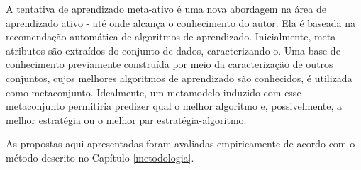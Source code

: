 A tentativa de aprendizado meta-ativo é uma nova abordagem na área de aprendizado ativo - até onde alcança o conhecimento do autor.
Ela é baseada na recomendação automática de algoritmos de aprendizado.
Inicialmente, meta-atributos são extraídos do conjunto de dados, caracterizando-o.
Uma base de conhecimento previamente construída por meio da caracterização de outros conjuntos, cujos melhores algoritmos de aprendizado são conhecidos, é utilizada como metaconjunto.
Idealmente, um metamodelo induzido com esse metaconjunto permitiria predizer qual o melhor  algoritmo e, possivelmente, a melhor estratégia ou o melhor par estratégia-algoritmo.

As propostas aqui apresentadas foram avaliadas empiricamente de acordo com o método descrito no Capítulo \ref{metodologia}.
